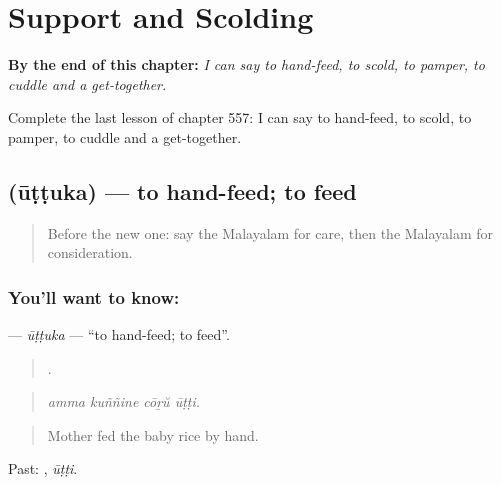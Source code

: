 
\chapter{Support and Scolding}
\label{ch:ml-support-and-scolding}

\begin{chapteropening}
\textbf{By the end of this chapter:} \emph{I can say to hand-feed, to scold, to pamper, to cuddle and a get-together.}

Complete the last lesson of chapter 557: I can say to hand-feed, to scold, to pamper, to cuddle and a get-together.
\end{chapteropening}

\section[\texorpdfstring{\ml{ഊട്ടുക} (ūṭṭuka)}{ഊട്ടുക (ūṭṭuka)}]{ (ūṭṭuka) — to hand-feed; to feed}

\label{lesson:ML-C557-uttuka}



\begin{quote}
Before the new one: say the Malayalam for care, then the Malayalam for consideration.
\end{quote}

\subsection*{You'll want to know: }
\textbf{} — \emph{ūṭṭuka} — \textquotedblleft{}to hand-feed; to feed\textquotedblright{}.

\begin{quote}
   .
\end{quote}

\begin{quote}
\emph{amma kuññine cōṟŭ ūṭṭi.}
\end{quote}

\begin{quote}
Mother fed the baby rice by hand.
\end{quote}

Past: , \emph{ūṭṭi}.


